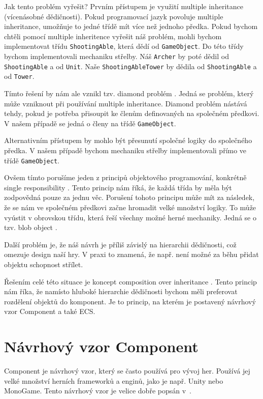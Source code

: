 
Jak tento problém vyřešit? Prvním přístupem je využití multiple inheritance  (vícenásobné dědičnosti). Pokud programovací jazyk povoluje multiple inheritance, umožňuje to jedné třídě mít více než jednoho předka. Pokud bychom chtěli pomocí multiple inheritence vyřešit náš problém, mohli bychom implementovat třídu \verb|ShootingAble|, která dědí od \verb|GameObject|. Do této třídy bychom implementovali mechaniku střelby. Náš \verb|Archer| by poté dědil od \verb|ShootingAble| a od \verb|Unit|. Naše \verb|ShootingAbleTower| by dědila od \verb|ShootingAble| a od \verb|Tower|.


Tímto řešení by nám ale vznikl tzv. diamond problém . Jedná se problém, který může vzniknout při používání multiple inheritance. Diamond problém nástává tehdy, pokud je potřeba přisoupit ke členům definovaných na společném předkovi. V našem případě se jedná o členy na třídě \verb|GameObject|.

Alternativním přístupem by mohlo být přesunutí společné logiky do společného předka. V našem případě bychom mechaniku střelby implementovali přímo ve třídě \verb|GameObject|.

Ovšem tímto porušíme jeden z principů objektového programování, konkrétně single responsibility . Tento princip nám říká, že každá třída by měla být zodpovědná pouze za jednu věc. Porušení tohoto principu může mít za následek, že se nám ve společném předkovi začne hromadit velké množství logiky. To může vyústit v obrovskou třídu, která řeší všechny možné herné mechaniky. Jedná se o tzv. blob object . 

Další problém je, že náš návrh je příliš závislý na hierarchii dědičnosti, což omezuje design naší hry. V praxi to znamená, že např. není možné za běhu přidat objektu schopnost střílet.

Řešením celé této situace je koncept composition over inheritance . Tento princip nám říka, že namísto hluboké hierarchie dědičnosti bychom měli preferovat rozdělení objektů do komponent. Je to princip, na kterém je postavený návrhový vzor Component a také ECS.


\section{Návrhový vzor Component}
\label{sec:component}
Component je návrhový vzor, který se často používá pro vývoj her. Používá jej velké množství herních frameworků a enginů, jako je např. Unity nebo MonoGame. Tento návrhový vzor je velice dobře popsán v~\citet{nystrom2014game}.

